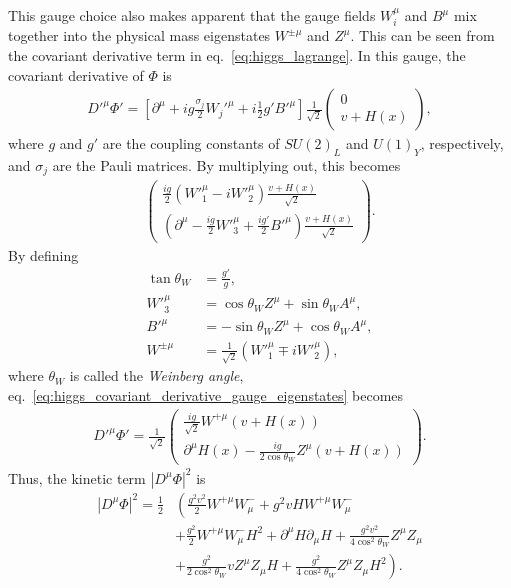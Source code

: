 \documentclass[twoside,english]{uiofysmaster}
\begin{document}
This gauge choice also makes apparent that the gauge fields $W^\mu_i$ and $B^\mu$ mix together into the physical mass eigenstates $W^{\pm\mu}$ and $Z^\mu$. This can be seen from the covariant derivative term in eq.\ \eqref{eq:higgs_lagrange}. In this gauge, the covariant derivative of $\Phi$ is
\begin{align}
	D'^\mu \Phi' = \left[ \partial^\mu + i g \frac{\sigma_j}{2} W_j'^\mu + i \frac{1}{2} g' B'^\mu \right]\frac{1}{\sqrt{2}}\begin{pmatrix}
		0 \\ v + H(x)
	\end{pmatrix},
\end{align}
where $g$ and $g'$ are the coupling constants of $SU(2)_L$ and $U(1)_Y$, respectively, and $\sigma_j$ are the Pauli matrices. By multiplying out, this becomes
\begin{align}
	\begin{pmatrix}
		\frac{ig}{2}(W'^\mu_1 - iW'^\mu_2) \frac{v+H(x)}{\sqrt{2}} \\
		\left( \partial^\mu - \frac{ig}{2}W'^\mu_3 + \frac{ig'}{2} B'^\mu \right) \frac{v+H(x)}{\sqrt{2}}\nonumber \label{eq:higgs_covariant_derivative_gauge_eigenstates}
	\end{pmatrix}.
\end{align}
By defining 
\begin{align}
	\tan\theta_W &= \frac{g'}{g},\nonumber\\
	{W'}^\mu_3 &= \cos\theta_W Z^\mu + \sin\theta_W A^\mu,\\
	{B'}^\mu &= -\sin\theta_W Z^\mu + \cos\theta_W A^\mu,\nonumber\\
	W^{\pm \mu} &= \frac{1}{\sqrt{2}} \left({W'}_1^\mu \mp i{W'}_2^\mu \right),\nonumber
\end{align}
where $\theta_W$ is called the {\it Weinberg angle}, eq.\ \eqref{eq:higgs_covariant_derivative_gauge_eigenstates} becomes 
\begin{align}
	D'^\mu\Phi' = \frac{1}{\sqrt{2}} \begin{pmatrix}
		\frac{ig}{\sqrt{2}} W^{+\mu}\left(v+H(x)\right) \\
		\partial^\mu H(x) - \frac{ig}{2\cos\theta_W}Z^\mu \left(v+H(x)\right) 
	\end{pmatrix}.
\end{align}
Thus, the kinetic term $|D^\mu \Phi|^2$ is
\begin{align}
	|D^\mu \Phi|^2 = \frac{1}{2}&\left( \frac{g^2v^2}{2} W^{+\mu} W^-_\mu + g^2vHW^{+\mu}W^-_\mu \right.\nonumber\\
	&+ \frac{g^2}{2} W^{+\mu}W^-_\mu H^2 + \partial^\mu H \partial_\mu H + \frac{g^2v^2}{4\cos^2\theta_W} Z^\mu Z_\mu \\
	&+ \left. \frac{g^2}{2\cos^2\theta_W} v Z^\mu Z_\mu H + \frac{g^2}{4\cos^2\theta_W}Z^\mu Z_\mu H^2 \right).\nonumber
\end{align}
\end{document}

